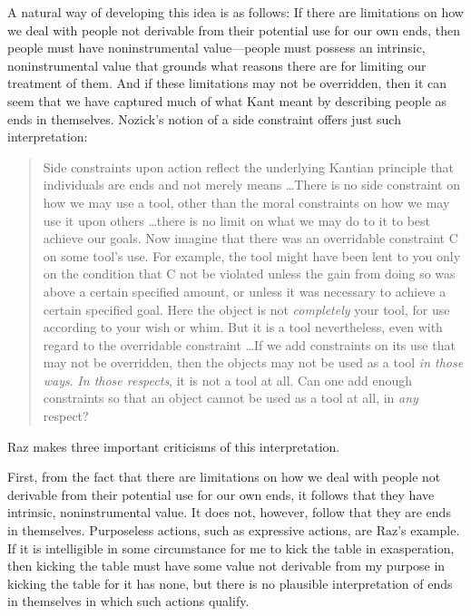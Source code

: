 \documentclass[12pt]{article}
\begin{document}
A natural way of developing this idea is as follows: If there are limitations on how we deal with people not derivable from their potential use for our own ends, then people must have noninstrumental value---people must possess an intrinsic, noninstrumental value that grounds what reasons there are for limiting our treatment of them. And if these limitations may not be overridden, then it can seem that we have captured much of what Kant meant by describing people as ends in themselves. Nozick's notion of a side constraint offers just such interpretation:
\begin{quote}
    Side constraints upon action reflect the underlying Kantian principle that individuals are ends and not merely means \ldots There is no side constraint on how we may use a tool, other than the moral constraints on how we may use it upon others \ldots there is no limit on what we may do to it to best achieve our goals. Now imagine that there was an overridable constraint C on some tool's use. For example, the tool might have been lent to you only on the condition that C not be violated unless the gain from doing so was above a certain specified amount, or unless it was necessary to achieve a certain specified goal. Here the object is not \emph{completely} your tool, for use according to your wish or whim. But it is a tool nevertheless, even with regard to the overridable constraint \ldots If we add constraints on its use that may not be overridden, then the objects may not be used as a tool \emph{in those ways}. \emph{In those respects}, it is not a tool at all. Can one add enough constraints so that an object cannot be used as a tool at all, in \emph{any} respect? \citep[p. xx]{Nozick:1974as}
\end{quote}

Raz makes three important criticisms of this interpretation.

First, from the fact that there are limitations on how we deal with people not derivable from their potential use for our own ends, it follows that they have intrinsic, noninstrumental value. It does not, however, follow that they are ends in themselves. Purposeless actions, such as expressive actions, are Raz's example. If it is intelligible in some circumstance for me to kick the table in exasperation, then kicking the table must have some value not derivable from my purpose in kicking the table for it has none, but there is no plausible interpretation of ends in themselves in which such actions qualify.
\end{document}
